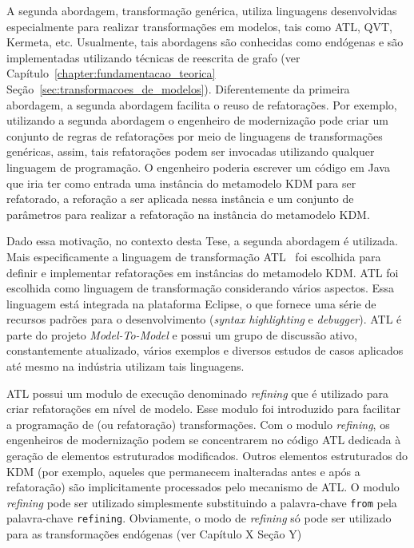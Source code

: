 A segunda abordagem, transformação genérica, utiliza linguagens desenvolvidas especialmente para realizar transformações em modelos, tais como ATL, QVT, Kermeta, etc. Usualmente, tais abordagens são conhecidas como endógenas e são implementadas utilizando técnicas de reescrita de grafo (ver Capítulo~\ref{chapter:fundamentacao_teorica} Seção~\ref{sec:transformacoes_de_modelos}). Diferentemente da primeira abordagem, a segunda abordagem facilita o reuso de refatorações. Por exemplo, utilizando a segunda abordagem o engenheiro de modernização pode criar um conjunto de regras de refatorações por meio de linguagens de transformações genéricas, assim, tais refatorações podem ser invocadas utilizando qualquer linguagem de programação. O engenheiro poderia escrever um código em Java que iria ter como entrada uma instância do metamodelo KDM para ser refatorado, a reforação a ser aplicada nessa instância e um conjunto de parâmetros para realizar a refatoração na instância do metamodelo KDM.

Dado essa motivação, no contexto desta Tese, a segunda abordagem é utilizada. Mais especificamente a linguagem de transformação ATL~\cite{ATL_eclipse,Jouault_2008} foi escolhida para definir e implementar refatorações em instâncias do metamodelo KDM. ATL foi escolhida como linguagem de transformação considerando vários aspectos. Essa linguagem está integrada na plataforma Eclipse, o que fornece uma série de recursos padrões para o desenvolvimento (\textit{syntax highlighting} e \textit{debugger}). ATL é parte do projeto \textit{Model-To-Model} e possui um grupo de discussão ativo, constantemente atualizado, vários exemplos e diversos estudos de casos aplicados até mesmo na indústria utilizam tais linguagens.


ATL possui um modulo de execução denominado \textit{refining} que é utilizado para criar refatorações em nível de modelo. Esse modulo foi introduzido para facilitar a programação de (ou refatoração) transformações. Com o modulo \textit{refining}, os engenheiros de modernização podem se concentrarem no código ATL dedicada à geração de elementos estruturados modificados. Outros elementos estruturados do KDM (por exemplo, aqueles que permanecem inalteradas antes e após a refatoração) são implicitamente processados pelo mecanismo de ATL. O modulo \textit{refining} pode ser utilizado simplesmente substituindo a palavra-chave \texttt{from} pela palavra-chave \texttt{refining}. Obviamente, o modo de \textit{refining} só pode ser utilizado para as transformações endógenas (ver Capítulo X Seção Y)


